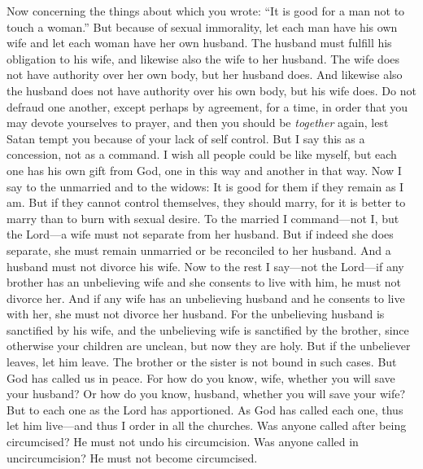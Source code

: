 \begin{biblechapter} %
 Now concerning the things about which you wrote: “It is good for a man not to touch a woman.”
\verse But because of sexual immorality, let each man have his own wife and let each woman have her own husband.
\verse The husband must fulfill his obligation to his wife, and likewise also the wife to her husband.
\verse The wife does not have authority over her own body, but her husband does. And likewise also the husband does not have authority over his own body, but his wife does.
\verse Do not defraud one another, except perhaps by agreement, for a time, in order that you may devote yourselves to prayer, and then you should be \textit{together} again, lest Satan tempt you because of your lack of self control.
\verse But I say this as a concession, not as a command.
\verse I wish all people could be like myself, but each one has his own gift from God, one in this way and another in that way.
\verse Now I say to the unmarried and to the widows: It is good for them if they remain as I am.
\verse But if they cannot control themselves, they should marry, for it is better to marry than to burn with sexual desire.
\verse To the married I command—not I, but the Lord—a wife must not separate from her husband.
\verse But if indeed she does separate, she must remain unmarried or be reconciled to her husband. And a husband must not divorce his wife.
\verse Now to the rest I say—not the Lord—if any brother has an unbelieving wife and she consents to live with him, he must not divorce her.
\verse And if any wife has an unbelieving husband and he consents to live with her, she must not divorce her husband.
\verse For the unbelieving husband is sanctified by his wife, and the unbelieving wife is sanctified by the brother, since otherwise your children are unclean, but now they are holy.
\verse But if the unbeliever leaves, let him leave. The brother or the sister is not bound in such cases. But God has called us in peace.
\verse For how do you know, wife, whether you will save your husband? Or how do you know, husband, whether you will save your wife?
\verse But to each one as the Lord has apportioned. As God has called each one, thus let him live—and thus I order in all the churches.
\verse Was anyone called after being circumcised? He must not undo his circumcision. Was anyone called in uncircumcision? He must not become circumcised.

\end{biblechapter}
